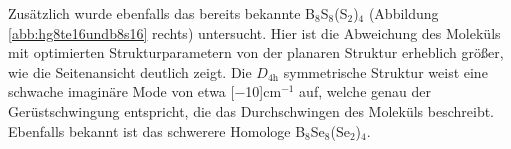 Zusätzlich wurde ebenfalls das bereits bekannte B$_8$S$_8$(S$_2$)$_4$\supercite{krebs1980b8s16} (Abbildung \ref{abb:hg8te16undb8s16} rechts) untersucht. Hier ist die Abweichung des Moleküls mit optimierten Strukturparametern von der planaren Struktur erheblich größer, wie die Seitenansicht deutlich zeigt. Die $D_{4\textrm{h}}$ symmetrische Struktur weist eine schwache imaginäre Mode von etwa \unit[$-$10]{cm$^{-1}$} auf, welche genau der Gerüstschwingung entspricht, die das Durchschwingen des Moleküls beschreibt. Ebenfalls bekannt ist das schwerere Homologe B$_8$Se$_8$(Se$_2$)$_4$.

